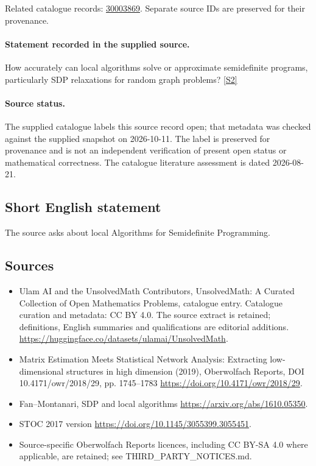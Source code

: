 \documentclass[11pt]{article}
\begin{document}
Related catalogue records: \href{https://mehmetmars7.github.io/Erdosproblems-llm-hunter/problem.html?type=open_problems&id=30003869}{30003869}. Separate source IDs are preserved for their provenance.
\paragraph{Statement recorded in the supplied source.}
How accurately can local algorithms solve or approximate semidefinite programs, particularly SDP relaxations for random graph problems? \href{https://doi.org/10.4171/owr/2018/29}{[S2]}
\paragraph{Source status.}
The supplied catalogue labels this source record open; that metadata was checked against the supplied snapshot on 2026-10-11. The label is preserved for provenance and is not an independent verification of present open status or mathematical correctness. The catalogue literature assessment is dated 2026-08-21.
\subsection{Short English statement}
The source asks about local Algorithms for Semidefinite Programming.
\subsection{Sources}
\begin{itemize}
\item[S1] Ulam AI and the UnsolvedMath Contributors, UnsolvedMath: A Curated Collection of Open Mathematics Problems, catalogue entry. Catalogue curation and metadata: CC BY 4.0. The source extract is retained; definitions, English summaries and qualifications are editorial additions.
\url{https://huggingface.co/datasets/ulamai/UnsolvedMath}.
\item[S2] Matrix Estimation Meets Statistical Network Analysis: Extracting low-dimensional structures in high dimension (2019), Oberwolfach Reports, DOI 10.4171/owr/2018/29, pp. 1745--1783
\url{https://doi.org/10.4171/owr/2018/29}.
\item[S3] Fan--Montanari, SDP and local algorithms
\url{https://arxiv.org/abs/1610.05350}.
\item[S4] STOC 2017 version
\url{https://doi.org/10.1145/3055399.3055451}.
\item Source-specific Oberwolfach Reports licences, including CC BY-SA 4.0 where applicable, are retained; see THIRD\_PARTY\_NOTICES.md.
\end{itemize}
\end{document}
